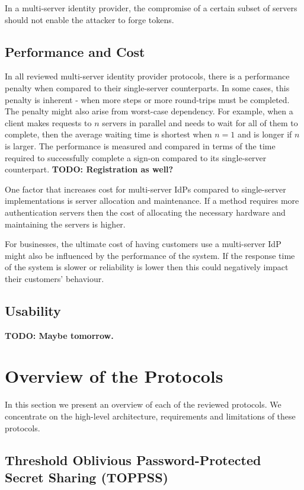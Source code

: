 \documentclass[article]{aaltoseries}
\newcommand{\todo}[1]{}
\renewcommand{\todo}[1]{{\color{red} \textbf{TODO: {#1}}}}
\begin{document}
In a multi-server identity provider, the compromise of a certain subset of servers should not enable the attacker to forge tokens. 


\subsection{Performance and Cost}

In all reviewed multi-server identity provider protocols, there is a performance penalty when compared to their single-server counterparts. In some cases, this penalty is inherent - when more steps or more round-trips must be completed. The penalty might also arise from worst-case dependency. For example, when a client makes requests to $n$ servers in parallel and needs to wait for all of them to complete, then the average waiting time is shortest when $n=1$ and is longer if $n$ is larger. The performance is measured and compared in terms of the time required to successfully complete a sign-on compared to its single-server counterpart. \todo{Registration as well?} 

One factor that increases cost for multi-server IdPs compared to single-server implementations is server allocation and maintenance. If a method requires more authentication servers then the cost of allocating the necessary hardware and maintaining the servers is higher.

For businesses, the ultimate cost of having customers use a multi-server IdP might also be influenced by the performance of the system. If the response time of the system is slower or reliability is lower then this could negatively impact their customers' behaviour.

\subsection{Usability}

\todo{Maybe tomorrow.}


\section{Overview of the Protocols}
\label{sec:solutions}

In this section we present an overview of each of the reviewed protocols. We concentrate on the high-level architecture, requirements and limitations of these protocols.

\subsection{Threshold Oblivious Password-Protected Secret Sharing (TOPPSS)}
\end{document}

